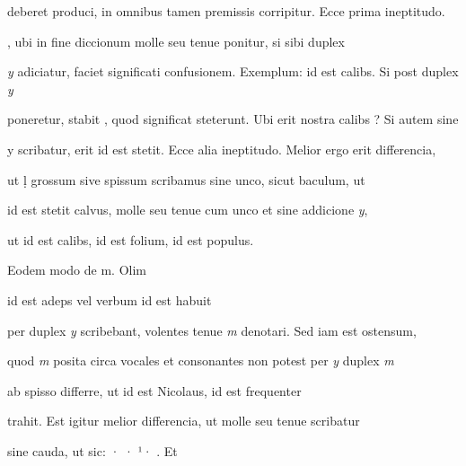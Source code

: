 deberet produci, in omnibus tamen premissis corripitur. Ecce prima ineptitudo. 

, ubi in fine diccionum  molle seu tenue ponitur, si sibi duplex

\textit{y} adiciatur, faciet significati confusionem. Exemplum:  id est calibs. Si post  duplex \textit{y}

poneretur, stabit , quod significat steterunt. Ubi erit nostra calibs ? Si autem sine 

y scribatur, erit  id est stetit.  Ecce alia ineptitudo. Melior ergo erit differencia,

ut ḷ grossum sive spissum scribamus sine unco, sicut baculum, ut  

 id est stetit calvus,  molle seu tenue cum unco et sine addicione \textit{y}, 

\splitlines
ut  id est calibs,  id est folium,  id est populus.

\indentK Eodem modo de \textmd{m}. Olim 

\fulllines
{}    id est adeps vel verbum id est habuit

per duplex \textit{y} scribebant, volentes tenue \textit{m} denotari. Sed iam est ostensum,

quod \textit{m} posita circa vocales et consonantes non potest per \textit{y} duplex \textit{m} 

 ab  spisso differre, ut  id est Nicolaus,  id est frequenter

trahit. Est igitur melior differencia, ut  molle seu tenue scribatur

sine cauda, ut sic: · · ¹·  . Et


\endinput



\newcommand{\margin}[1]{\annotatetextBlue{\{#1\}}{zapisy na marginesie}}



\renewcommand{\over}[1]{\annotatetextBlue{\{#1\}}{zapisy nad rządkami}}

